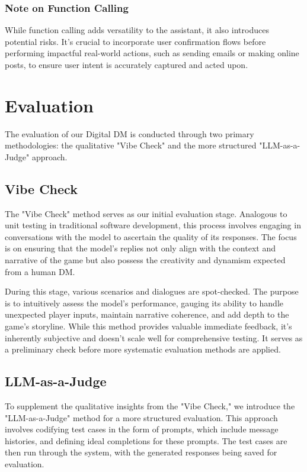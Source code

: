 \documentclass[letterpaper]{article}
\begin{document}
\subsubsection{Note on Function Calling}
While function calling adds versatility to the assistant, it also introduces potential risks. It's crucial to incorporate user confirmation flows before performing impactful real-world actions, such as sending emails or making online posts, to ensure user intent is accurately captured and acted upon.

\section{Evaluation}

The evaluation of our Digital DM is conducted through two primary methodologies: the qualitative "Vibe Check" and the more structured "LLM-as-a-Judge" approach.

\subsection{Vibe Check}
The "Vibe Check" method serves as our initial evaluation stage. Analogous to unit testing in traditional software development, this process involves engaging in conversations with the model to ascertain the quality of its responses. The focus is on ensuring that the model's replies not only align with the context and narrative of the game but also possess the creativity and dynamism expected from a human DM.

During this stage, various scenarios and dialogues are spot-checked. The purpose is to intuitively assess the model's performance, gauging its ability to handle unexpected player inputs, maintain narrative coherence, and add depth to the game's storyline. While this method provides valuable immediate feedback, it's inherently subjective and doesn't scale well for comprehensive testing. It serves as a preliminary check before more systematic evaluation methods are applied.

\subsection{LLM-as-a-Judge}
To supplement the qualitative insights from the "Vibe Check," we introduce the "LLM-as-a-Judge" method \cite{zheng2023judging} for a more structured evaluation. This approach involves codifying test cases in the form of prompts, which include message histories, and defining ideal completions for these prompts. The test cases are then run through the system, with the generated responses being saved for evaluation.
\end{document}
